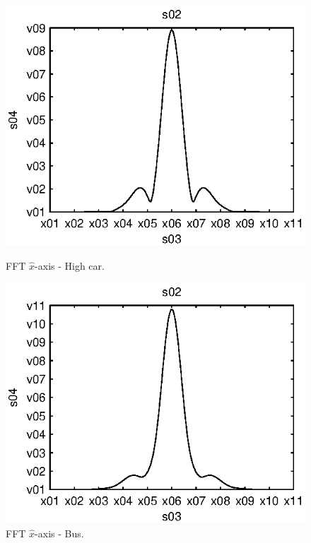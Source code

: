 \begin{subfigures}
\begin{figure}[thb]
\begin{minipage}{0.45\linewidth}
 	\centering
 	
	\includegraphics[width=1\linewidth]{images/fft-high_car-x}
  	\caption[FFT $\hat{x}$-axis - High car]{FFT $\hat{x}$-axis - High car.}
  	\label{fig:fft-high_car-x}
 \end{minipage} \hfill
 \begin{minipage}{0.45\linewidth}
 \centering
 	
	\includegraphics[width=1\linewidth]{images/fft-bus-x}
  	\caption[FFT $\hat{x}$-axis - Bus]{FFT $\hat{x}$-axis - Bus.}
  	\label{fig:fft-bus-x}
 \end{minipage}
\end{figure}
\end{subfigures}

